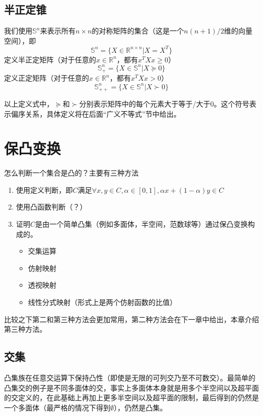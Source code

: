\documentclass[12pt,a4paper]{book}
\begin{document}
\subsection{半正定锥}

我们使用$\mathbb{S}^n$来表示所有$n\times n$的对称矩阵的集合（这是一个$n(n+1)/2$维的向量空间），即
$$\mathbb{S}^n=\{X\in\mathbb{R}^{n\times n}|X=X^T \}$$
定义半正定矩阵（对于任意的$x\in\mathbb{R}^n$，都有$x^TXx\geq 0$）
$$\mathbb{S}^n_+ = \{X\in \mathbb{S}^n|X\succeq 0\}$$
定义正定矩阵（对于任意的$x\in\mathbb{R}^n$，都有$x^TXx> 0$）$$\mathbb{S}^n_{++} = \{X\in \mathbb{S}^n|X\succ 0\}$$

以上定义式中，$\succeq$和$\succ$分别表示矩阵中的每个元素大于等于/大于0。这个符号表示偏序关系，具体定义将在后面“广义不等式”节中给出。

\section{保凸变换}

怎么判断一个集合是凸的？主要有三种方法
\begin{enumerate}
    \item 使用定义判断，即$C$满足$\forall x,y\in C, \alpha\in[0,1], \alpha x+(1-\alpha)y\in C$
    \item 使用凸函数判断（？）
    \item 证明$C$是由一个简单凸集（例如多面体，半空间，范数球等）通过保凸变换构成的。
    \begin{itemize}
        \item 交集运算
        \item 仿射映射
        \item 透视映射
        \item 线性分式映射（形式上是两个仿射函数的比值）
    \end{itemize}
\end{enumerate}

比较之下第二和第三种方法会更加常用，第二种方法会在下一章中给出，本章介绍第三种方法。

\subsection{交集}

凸集族在任意交运算下保持凸性（即使是无限的可列交乃至不可数交）。最简单的凸集交的例子是不同多面体的交，事实上多面体本身就是用多个半空间以及超平面的交定义的，在此基础上再加上更多半空间以及超平面的限制，最后得到的仍然是一个多面体（最严格的情况下得到$\emptyset$），仍然是凸集。
\end{document}

